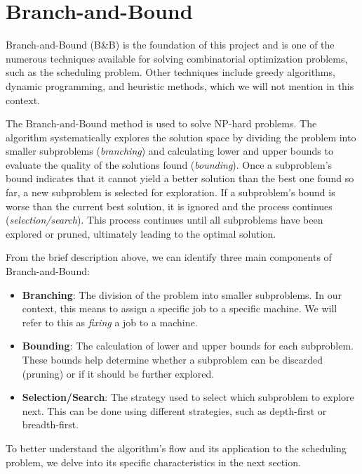 \section{Branch-and-Bound}
Branch-and-Bound (B\&B) is the foundation of this project and is one of the numerous techniques available for solving combinatorial optimization problems, such as the scheduling problem.
Other techniques include greedy algorithms, dynamic programming, and heuristic methods, which we will not mention in this context.

The Branch-and-Bound method is used to solve NP-hard problems.
The algorithm systematically explores the solution space by dividing the problem into smaller subproblems (\emph{branching}) and calculating lower and upper bounds to evaluate the quality of the solutions found (\emph{bounding}). Once a subproblem's bound indicates that it cannot yield a better solution than the best one found so far, a new subproblem is selected for exploration.
If a subproblem's bound is worse than the current best solution, it is ignored and the process continues (\emph{selection/search}). This process continues until all subproblems have been explored or pruned, ultimately leading to the optimal solution.

From the brief description above, we can identify three main components of Branch-and-Bound:
\begin{itemize}
  \item \textbf{Branching}: The division of the problem into smaller subproblems.
  In our context, this means to assign a specific job to a specific machine.
  We will refer to this as \emph{fixing} a job to a machine.
  \item \textbf{Bounding}: The calculation of lower and upper bounds for each subproblem.
  These bounds help determine whether a subproblem can be discarded (pruning) or if it should be further explored.
  \item \textbf{Selection/Search}: The strategy used to select which subproblem to explore next.
  This can be done using different strategies, such as depth-first or breadth-first.
\end{itemize}

To better understand the algorithm's flow and its application to the scheduling problem, we delve into its specific characteristics in the next section.


